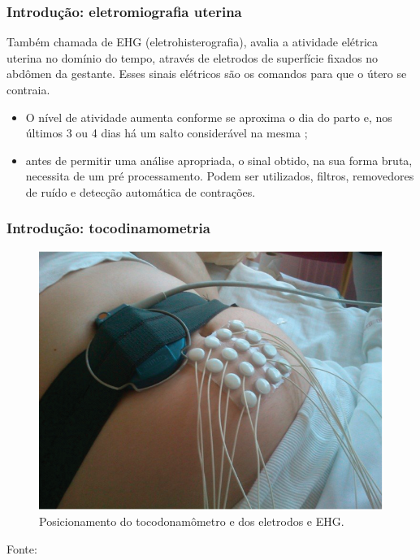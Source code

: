 \documentclass{beamer}
\begin{document}
\begin{frame}
	\frametitle{Introdu\c{c}\~ao: eletromiografia uterina}	
	
	Também chamada de EHG (eletrohisterografia), avalia a atividade elétrica uterina no domínio do tempo, através de eletrodos de superfície fixados no abdômen da gestante. Esses sinais elétricos são os comandos para que o útero se contraia. 
	
	\begin{itemize}
		
		\item O nível de atividade aumenta conforme se aproxima o dia do parto e, nos últimos 3 ou 4 dias há um salto considerável na mesma \cite{ref-lucovnik};
		
		\item antes de permitir uma análise apropriada, o sinal obtido, na sua forma bruta, necessita de um pré processamento. Podem ser utilizados, filtros, removedores de ruído e detecção automática de contrações.
		
	\end{itemize}
	
\end{frame}



\begin{frame}
	\frametitle{Introdu\c{c}\~ao: tocodinamometria}	
	
	\begin{figure}[H]
		\caption{\label{barrigao} Posicionamento do tocodonamômetro e dos eletrodos e EHG.}
		\begin{center}
			\includegraphics[scale=0.35]{imagens/barrigao.png} 		
		\end{center}
	\end{figure}
	
	Fonte: \cite{ref-islddatabase}
	
\end{frame}
\end{document}
